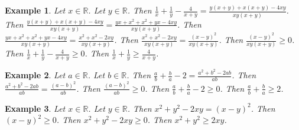 \documentclass[12pt]{article}
\newtheorem{example}{Example}
\begin{document}
\begin{example}
    Let $x\in\mathbb{R}$. Let $y\in\mathbb{R}$.
    Then $\frac{1}{x} + \frac{1}{y} - \frac{4}{x+y} = \frac{y(x+y) + x(x+y) - 4xy}{xy(x+y)}$.
    Then $\frac{y(x+y) + x(x+y) - 4xy}{xy(x+y)} = \frac{yx + x^2 + x^2 + yx - 4xy}{xy(x+y)}$.
    Then $\frac{yx + x^2 + x^2 + yx - 4xy}{xy(x+y)} = \frac{x^2 + x^2 -2xy}{xy(x+y)}$. %
    Then $\frac{x^2 + x^2 -2xy}{xy(x+y)} = \frac{{(x-y)}^2}{xy(x+y)}$.
    Then $\frac{{(x-y)}^2}{xy(x+y)} \ge 0$.
    Then $\frac{1}{x} + \frac{1}{y} - \frac{4}{x+y} \ge 0$.
    Then $\frac{1}{x} + \frac{1}{y} \ge \frac{4}{x+y}$.
\end{example}

\begin{example}
    Let $a\in\mathbb{R}$. Let $b\in\mathbb{R}$.
    Then $\frac{a}{b} + \frac{b}{a} - 2 = \frac{a^2 + b^2 - 2ab}{ab}$.
    Then $\frac{a^2 + b^2 - 2ab}{ab} = \frac{{(a-b)}^2}{ab}$.
    Then $\frac{{(a-b)}^2}{ab} \ge 0$.
    Then $\frac{a}{b} + \frac{b}{a} - 2 \ge 0$.
    Then $\frac{a}{b} + \frac{b}{a} \ge 2$.
\end{example}

\begin{example}
    Let $x\in\mathbb{R}$. Let $y\in\mathbb{R}$.
    Then $x^2 + y^2 - 2xy = {(x-y)}^2$.
    Then ${(x-y)}^2 \ge 0$.
    Then $x^2 + y^2 - 2xy \ge 0$.
    Then $x^2 + y^2 \ge 2xy$.
\end{example}
\end{document}
